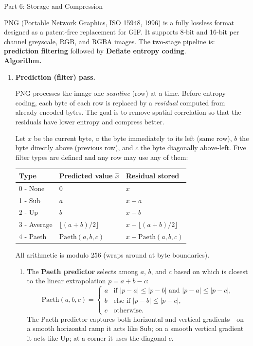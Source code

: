 \documentclass[letterpaper]{article}
\begin{document}
\begin{notes}{Part 6: Storage and Compression}

PNG (Portable Network Graphics, ISO 15948, 1996) is a fully lossless format designed as a patent-free replacement for GIF. It supports 8-bit and 16-bit per channel greyscale, RGB, and RGBA images. The two-stage pipeline is: \textbf{prediction filtering} followed by \textbf{Deflate entropy coding}.\\


\textbf{Algorithm.}
\begin{enumerate}
    \item \textbf{Prediction (filter) pass.}

    PNG processes the image one \emph{scanline} (row) at a time. Before entropy coding, each byte of each row is replaced by a \emph{residual} computed from already-encoded bytes. The goal is to remove spatial correlation so that the residuals have lower entropy and compress better.
    
    Let $x$ be the current byte, $a$ the byte immediately to its left (same row), $b$ the byte directly above (previous row), and $c$ the byte diagonally above-left. Five filter types are defined and any row may use any of them:
    \begin{center}
    \begin{tabular}{@{}lll@{}}
    \toprule
    Type & Predicted value $\hat{x}$ & Residual stored \\
    \midrule
    0 - None   & $0$                  & $x$ \\
    1 - Sub    & $a$                  & $x - a$ \\
    2 - Up     & $b$                  & $x - b$ \\
    3 - Average & $\lfloor(a+b)/2\rfloor$ & $x - \lfloor(a+b)/2\rfloor$ \\
    4 - Paeth  & $\mathrm{Paeth}(a,b,c)$  & $x - \mathrm{Paeth}(a,b,c)$ \\
    \bottomrule
    \end{tabular}
    \end{center}
    All arithmetic is modulo 256 (wraps around at byte boundaries).

    \begin{enumerate}
        \item The \textbf{Paeth predictor} selects among $a$, $b$, and $c$ based on which is closest to the linear extrapolation $p = a + b - c$:
        $$\mathrm{Paeth}(a,b,c) = \begin{cases} a & \text{if } |p-a| \le |p-b| \text{ and } |p-a| \le |p-c|, \\ b & \text{else if } |p-b| \le |p-c|, \\ c & \text{otherwise.} \end{cases}$$
        The Paeth predictor captures both horizontal and vertical gradients - on a smooth horizontal ramp it acts like Sub; on a smooth vertical gradient it acts like Up; at a corner it uses the diagonal $c$.
        

\end{enumerate}
\end{enumerate}
\end{notes}
\end{document}
